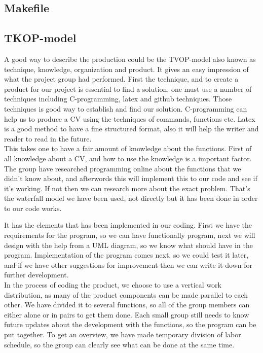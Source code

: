 \subsection{Makefile}

\subsection{TKOP-model}
A good way to describe the production could be the TVOP-model also known as technique, knowledge, organization and product.
It gives an easy impression of what the project group had performed.
First the technique, and to create a product for our project is essential to find a solution, 
one must use a number of techniques including C-programming, latex and github techniques.
Those techniques is good way to establish and find our solution. C-programming can help us to produce a CV using the techniques
of commands, functions etc. Latex is a good method to have a fine structured format, 
also it will help the writer and reader to read in the future. \\

This takes one to have a fair amount of knowledge about the functions.
First of all knowledge about a CV, and how to use the knowledge is a important factor.
The group have researched programming online about the functions that we didn't know about, 
and afterwords this will implement this to our code and see if it's working. If not then we can research more about the exact problem.
That's the waterfall model we have been used, not directly but it has been done in order to our code works.

It has the elements that has been implemented in our coding. First we have the requirements for the program, 
so we can have functionally program, next we will design with the help from a UML diagram, 
so we know what should have in the program. Implementation of the program comes next, so we could test it later, 
and if we have other suggestions for improvement then we can write it down for further development.\\

In the process of coding the product, we choose to use a vertical work distribution, as many of the product
components can be made parallel to each other. We have divided it to several functions, 
so all of the group members can either alone or in pairs to get them done.
Each small group still needs to know future updates about the development with the functions, so the program can be put together.
To get an overview, we have made temporary division of labor
schedule, so the group can clearly see what can be done at the same time. \\

